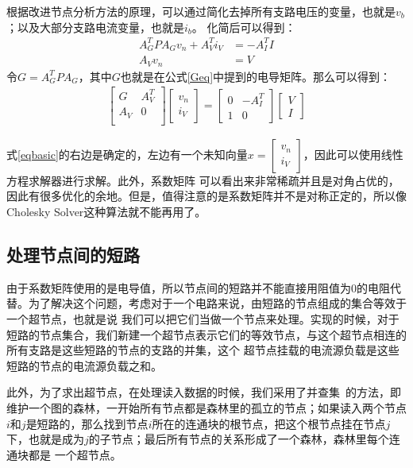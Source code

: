 根据改进节点分析方法的原理，可以通过简化去掉所有支路电压的变量，也就是$v_b$；以及大部分支路电流变量，也就是$i_b$。
化简后可以得到：
\begin{align}
    A_G^T P A_G v_n + A_V^T i_V & = -A_I^T I    \\
    A_V v_n & =V
\end{align}
令$G=A_G^T P A_G$，其中$G$也就是在公式\ref{Geq}中提到的电导矩阵。那么可以得到：
\begin{align}
    \begin{bmatrix}
    G & A_V^T \\
    A_V & 0 \\
    \end{bmatrix}
    \begin{bmatrix}
    v_n \\ i_V
    \end{bmatrix}
    =
    \begin{bmatrix}
    0 & -A_I^T  \\
    1 & 0
    \end{bmatrix}
    \begin{bmatrix}
    V \\ I
    \end{bmatrix}
    \label{eqbasic}
\end{align}

式\ref{eqbasic}的右边是确定的，左边有一个未知向量$x=\begin{bmatrix}v_n \\ i_V\end{bmatrix}$，因此可以使用线性方程求解器进行求解。此外，系数矩阵
可以看出来非常稀疏并且是对角占优的，因此有很多优化的余地。但是，值得注意的是系数矩阵并不是对称正定的，所以像Cholesky Solver这种算法就不能再用了。

\subsection{处理节点间的短路}

由于系数矩阵使用的是电导值，所以节点间的短路并不能直接用阻值为0的电阻代替。为了解决这个问题，考虑对于一个电路来说，由短路的节点组成的集合等效于一个超节点，也就是说
我们可以把它们当做一个节点来处理。实现的时候，对于短路的节点集合，我们新建一个超节点表示它们的等效节点，与这个超节点相连的所有支路是这些短路的节点的支路的并集，这个
超节点挂载的电流源负载是这些短路的节点的电流源负载之和。

此外，为了求出超节点，在处理读入数据的时候，我们采用了并查集~\cite{tarjan1975efficiency}的方法，即维护一个图的森林，一开始所有节点都是森林里的孤立的节点；如果读入两个节点$i$和$j$是短路的，那么找到节点$i$所在的连通块的根节点，把这个根节点挂在节点$j$下，也就是成为$j$的子节点；最后所有节点的关系形成了一个森林，森林里每个连通块都是
一个超节点。

